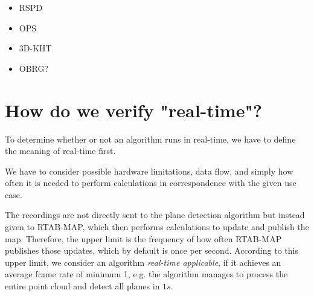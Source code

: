 \documentclass[main.tex]{subfiles}
\begin{document}
\begin{itemize}
    \item RSPD
    \item OPS
    \item 3D-KHT
    \item OBRG?
\end{itemize}


\section{How do we verify "real-time"?}
To determine whether or not an algorithm runs in real-time, we have to define the meaning of real-time first.

We have to consider possible hardware limitations, data flow, and simply
how often it is needed to perform calculations in correspondence with the given use case.

The recordings are not directly sent to the plane detection algorithm but instead given to RTAB-MAP, which then performs calculations to update and publish the map.
Therefore, the upper limit is the frequency of how often RTAB-MAP publishes those updates, which by default is once per second.
According to this upper limit, we consider an algorithm \textit{real-time applicable}, if it achieves an average frame
rate of minimum 1, e.g. the algorithm manages to process the entire point cloud and detect all planes in $1s$.

\end{document}
